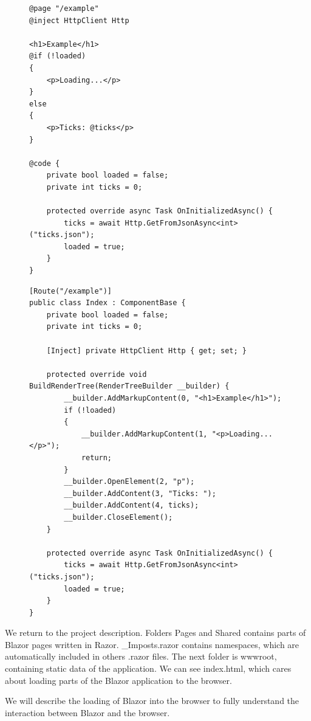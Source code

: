 \begin{figure}
\begin{minipage}[c]{0.95\textwidth}
\begin{lstlisting}[basicstyle=\small, caption=Example of Razor page., label={lst:razorpage}]
@page "/example"
@inject HttpClient Http

<h1>Example</h1>
@if (!loaded)
{
    <p>Loading...</p>
}
else
{
    <p>Ticks: @ticks</p>
}

@code {
    private bool loaded = false;
    private int ticks = 0;

    protected override async Task OnInitializedAsync() {
        ticks = await Http.GetFromJsonAsync<int>("ticks.json");
        loaded = true;
    }
}
\end{lstlisting}
\end{minipage}
\begin{minipage}[c]{0.95\textwidth}
\begin{lstlisting}[basicstyle=\small, caption=Razor page generated to the C\# class., label={lst:component}]
[Route("/example")]
public class Index : ComponentBase {
	private bool loaded = false;
	private int ticks = 0;
	
	[Inject] private HttpClient Http { get; set; }

	protected override void BuildRenderTree(RenderTreeBuilder __builder) {
		__builder.AddMarkupContent(0, "<h1>Example</h1>");
		if (!loaded)
		{
			__builder.AddMarkupContent(1, "<p>Loading...</p>");
			return;
		}
		__builder.OpenElement(2, "p");
		__builder.AddContent(3, "Ticks: ");
		__builder.AddContent(4, ticks);
		__builder.CloseElement();
	}

	protected override async Task OnInitializedAsync() {
		ticks = await Http.GetFromJsonAsync<int>("ticks.json");
		loaded = true;
	}
}
\end{lstlisting}
\end{minipage}
\end{figure}
\par
{}
\par
We return to the project description. 
Folders Pages and Shared contains parts of Blazor pages written in Razor.
\_Imposts.razor contains namespaces, which are automatically included in others .razor files.
The next folder is wwwroot, containing static data of the application.
We can see index.html, which cares about loading parts of the Blazor application to the browser.
\par
We will describe the loading of Blazor into the browser to fully understand the interaction between Blazor and the browser.
